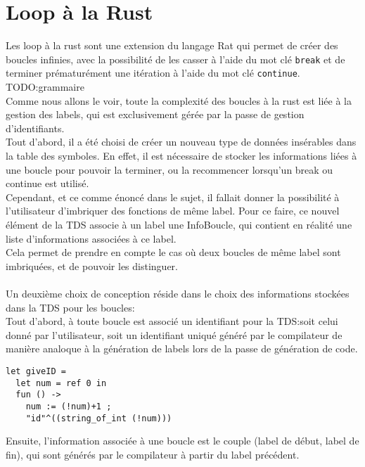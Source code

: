 \documentclass[french]{article}
\begin{document}
\section{Loop à la Rust}
Les loop à la rust sont une extension du langage Rat qui permet de créer des boucles infinies,
avec la possibilité de les casser à l'aide du mot clé \texttt{break} 
et de terminer prématurément une itération à l'aide du mot clé \texttt{continue}. \\
TODO:\@ grammaire \\
Comme nous allons le voir, toute la complexité des boucles à la rust est liée à la gestion des labels, qui est exclusivement gérée par la passe de gestion d'identifiants. \\
Tout d'abord, il a été choisi de créer un nouveau type de données insérables dans la table des symboles.
En effet, il est nécessaire de stocker les informations liées à une boucle pour pouvoir la terminer, ou la recommencer
lorsqu'un break ou continue est utilisé. \\
Cependant, et ce comme énoncé dans le sujet, il fallait donner la possibilité à l'utilisateur d'imbriquer des fonctions de même label.
Pour ce faire, ce nouvel élément de la TDS associe à un label une InfoBoucle, qui contient en réalité une liste d'informations associées à ce label.\\
Cela permet de prendre en compte le cas où deux boucles de même label sont imbriquées, et de pouvoir les distinguer. \\\\ %
Un deuxième choix de conception réside dans le choix des informations stockées dans la TDS pour les boucles: \\
Tout d'abord, à toute boucle est associé un identifiant pour la TDS:\@ soit celui donné par l'utilisateur, soit un identifiant uniqué généré par le compilateur
de manière analoque à la génération de labels lors de la passe de génération de code. \\
\begin{lstlisting}
let giveID = 
  let num = ref 0 in
  fun () ->
    num := (!num)+1 ;
    "id"^((string_of_int (!num)))
\end{lstlisting} 
Ensuite, l'information associée à une boucle est le couple (label de début, label de fin), qui sont générés par le compilateur à partir du label précédent. \\
\end{document}

